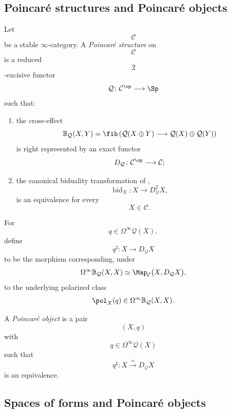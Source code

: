 \subsection{Poincar\'e structures and Poincar\'e objects}

\begin{definition}
\label{def:quadratic-poincare-structure}
Let
\[
    \mathcal C
\]
be a stable $\infty$-category. A \emph{Poincar\'e structure} on
\[
    \mathcal C
\]
is a reduced
\[
    2
\]
-excisive functor
\[
    \mathcal Q
    \colon
    \mathcal C^{\op}
    \longrightarrow
    \Sp
\]
such that:
\begin{enumerate}[label=(\roman*)]
    \item the cross-effect
    \[
        \mathbb B_{\mathcal Q}(X,Y)
        =
        \fib
        \left(
            \mathcal Q(X\oplus Y)
            \longrightarrow
            \mathcal Q(X)\oplus\mathcal Q(Y)
        \right)
    \]
    is right represented by an exact functor
    \[
        D_{\mathcal Q}
        \colon
        \mathcal C^{\op}
        \longrightarrow
        \mathcal C;
    \]

    \item the canonical biduality transformation of
    ,
    \[
        \operatorname{bid}_X
        \colon
        X
        \longrightarrow
        D_{\mathcal Q}^{2}X,
    \]
    is an equivalence for every
    \[
        X\in\mathcal C.
    \]
\end{enumerate}

For
\[
    q\in\Omega^\infty\mathcal Q(X),
\]
define
\[
    q^\sharp
    \colon
    X
    \longrightarrow
    D_{\mathcal Q}X
\]
to be the morphism corresponding, under
\[
    \Omega^\infty
    \mathbb B_{\mathcal Q}(X,X)
    \simeq
    \Map_{\mathcal C}
    \bigl(
        X,
        D_{\mathcal Q}X
    \bigr),
\]
to the underlying polarized class
\[
    \pol_X(q)
    \in
    \Omega^\infty
    \mathbb B_{\mathcal Q}(X,X).
\]

A \emph{Poincar\'e object} is a pair
\[
    (X,q)
\]
with
\[
    q\in\Omega^\infty\mathcal Q(X)
\]
such that
\[
    q^\sharp
    \colon
    X
    \xrightarrow{\;\simeq\;}
    D_{\mathcal Q}X
\]
is an equivalence.
\end{definition}


\subsection{Spaces of forms and Poincar\'e objects}

